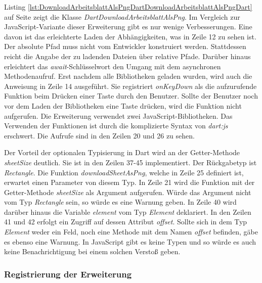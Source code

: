 Listing \ref{lst:DownloadArbeitsblattAlsPngDartDownloadArbeitsblattAlsPngDart} auf Seite \pageref{lst:DownloadArbeitsblattAlsPngDartDownloadArbeitsblattAlsPngDart} zeigt die Klasse \textit{DartDownloadArbeitsblattAlsPng}. Im Vergleich zur JavaScript-Variante dieser Erweiterung gibt es nur wenige Verbesserungen. Eine davon ist das erleichterte Laden der Abhängig\-keiten, was in Zeile 12 zu sehen ist. Der absolute Pfad muss nicht vom Entwickler konstruiert werden. Stattdessen reicht die Angabe der zu ladenden Dateien über relative Pfade. Darüber hinaus erleichtert das \textit{await}-Schlüssel\-wort den Umgang mit dem asynchronen Methodenaufruf. Erst nachdem alle Bibliotheken geladen wurden, wird auch die Anweisung in Zeile 14 ausgeführt. Sie registriert \textit{onKeyDown} als die aufzurufende Funktion beim Drücken einer Taste durch den Benutzer. Sollte der Benutzer noch vor dem Laden der Bibliotheken eine Taste drücken, wird die Funktion nicht aufgerufen.
\newpage
Die Erweiterung verwendet zwei JavaScript-Bibliotheken. Das Verwenden der Funktionen ist durch die komplizierte Syntax von \textit{dart:js} erschwert. Die Aufrufe sind in den Zeilen 20 und 26 zu sehen. 

Der Vorteil der optionalen Typisierung in Dart wird an der Getter-Methode \textit{sheetSize} deutlich. Sie ist in den Zeilen 37-45 implementiert. Der Rückgabetyp ist \textit{Rectangle}. Die Funktion \textit{downloadSheetAsPng}, welche in Zeile 25 definiert ist, erwartet einen Parameter von diesem Typ. In Zeile 21 wird die Funktion mit der Getter-Methode \textit{sheetSize} als Argument aufgerufen. Würde das Argument nicht vom Typ \textit{Rectangle} sein, so würde es eine Warnung geben. In Zeile 40 wird darüber hinaus die Variable \textit{element} vom Typ \textit{Element} deklariert. In den Zeilen 41 und 42 erfolgt ein Zugriff auf dessen Attribut \textit{offset}. Sollte sich in dem Typ \textit{Element} weder ein Feld, noch eine Methode mit dem Namen \textit{offset} befinden, gäbe es ebenso eine Warnung. In JavaScript gibt es keine Typen und so würde es auch keine Benachrichtigung bei einem solchen Verstoß geben.

\subsubsection{Registrierung der Erweiterung}


